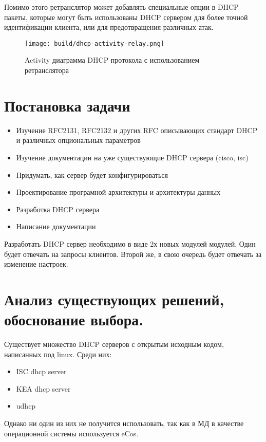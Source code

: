 \documentclass[14pt,a4paper]{extarticle}
\begin{document}
Помимо этого ретранслятор может добавлять специальные опции в DHCP пакеты, которые могут быть использованы DHCP сервером для более точной идентификации клиента, или для предотвращения различных атак. \cite{rfc3046}


\begin{figure}[H]
    \centering
    \texttt{[image: build/dhcp-activity-relay.png]}
    \caption{Activity диаграмма DHCP протокола с использованием ретранслятора}
\end{figure}

\section{Постановка задачи}

\begin{itemize}
    \item Изучение RFC2131, RFC2132 и других RFC описывающих стандарт DHCP и различных опциональных параметров
    \item Изучение документации на уже существующие DHCP сервера (cisco, isc)
    \item Придумать, как сервер будет конфигурироваться
    \item Проектирование програмной архитектуры и архитектуры данных
    \item Разработка DHCP сервера
    \item Написание документации
\end{itemize}

Разработать DHCP сервер необходимо в виде 2х новых модулей модулей.
Один будет отвечать на запросы клиентов.
Второй же, в свою очередь будет отвечать за изменение настроек.

\section{Анализ существующих решений, обоснование выбора.}

Существует множество DHCP серверов с открытым исходным кодом, написанных под linux. Среди них:
\begin{itemize}
    \item ISC dhcp server
    \item KEA dhcp server
    \item udhcp
\end{itemize}

Однако ни один из них не получится использовать, так как в МД в качестве операционной системы используется eCos.
\end{document}
